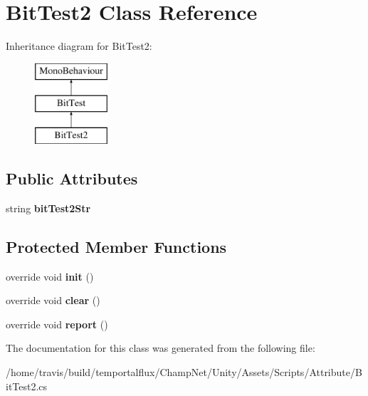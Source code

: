 \hypertarget{class_bit_test2}{\section{Bit\-Test2 Class Reference}
\label{class_bit_test2}
}
Inheritance diagram for Bit\-Test2\-:\begin{figure}[H]
\begin{center}
\leavevmode
\includegraphics[height=3.000000cm]{class_bit_test2}
\end{center}
\end{figure}
\subsection*{Public Attributes}
\begin{DoxyCompactItemize}
\item 
\hypertarget{class_bit_test2_adb24602605c8f93489e0a78c52fc11c6}{string {\bfseries bit\-Test2\-Str}}\label{class_bit_test2_adb24602605c8f93489e0a78c52fc11c6}

\end{DoxyCompactItemize}
\subsection*{Protected Member Functions}
\begin{DoxyCompactItemize}
\item 
\hypertarget{class_bit_test2_a771a1f26d53e4c517c699a8f3b7d0030}{override void {\bfseries init} ()}\label{class_bit_test2_a771a1f26d53e4c517c699a8f3b7d0030}

\item 
\hypertarget{class_bit_test2_a8cb95cc5e19810422c02ae5cb6cbebb7}{override void {\bfseries clear} ()}\label{class_bit_test2_a8cb95cc5e19810422c02ae5cb6cbebb7}

\item 
\hypertarget{class_bit_test2_a6b18710da1118238f4d184b14094ab17}{override void {\bfseries report} ()}\label{class_bit_test2_a6b18710da1118238f4d184b14094ab17}

\end{DoxyCompactItemize}


The documentation for this class was generated from the following file\-:\begin{DoxyCompactItemize}
\item 
/home/travis/build/temportalflux/\-Champ\-Net/\-Unity/\-Assets/\-Scripts/\-Attribute/Bit\-Test2.\-cs\end{DoxyCompactItemize}
